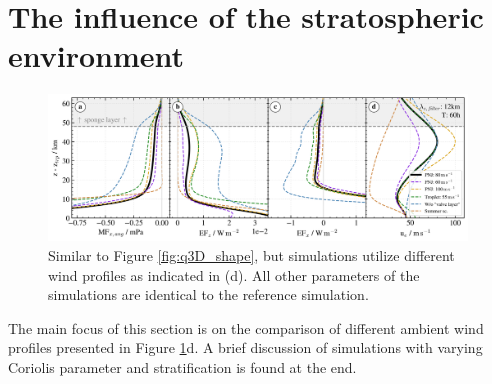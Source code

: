 \section{The influence of the stratospheric environment}
\label{sec:q3D-wind}
\begin{figure}[t]
    \centering
    \includegraphics[width=0.99\textwidth]{figures_q3D/TD-zprofiles-translbq3D_wind-T60h-avg.png}
    \caption{Similar to Figure \ref{fig:q3D_shape}, but simulations utilize different wind profiles as indicated in (d). All other parameters of the simulations are identical to the reference simulation.}
    \label{fig:q3D_wind}
\end{figure}
The main focus of this section is on the comparison of different ambient wind profiles presented in Figure \ref{fig:q3D_wind}d. A brief discussion of simulations with varying Coriolis parameter and stratification is found at the end.

